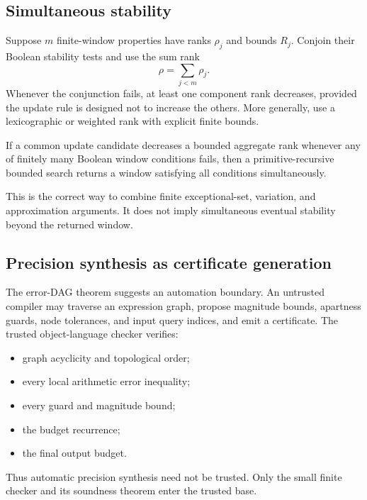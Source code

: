 \subsection{Simultaneous stability}

Suppose $m$ finite-window properties have ranks $\rho_j$ and bounds $R_j$.  Conjoin their Boolean stability tests and use the sum rank
\[
  \rho=\sum_{j<m}\rho_j.
\]
Whenever the conjunction fails, at least one component rank decreases, provided the update rule is designed not to increase the others.  More generally, use a lexicographic or weighted rank with explicit finite bounds.

\begin{corollary}
\label{cor:common-window}
If a common update candidate decreases a bounded aggregate rank whenever any of finitely many Boolean window conditions fails, then a primitive-recursive bounded search returns a window satisfying all conditions simultaneously.
\end{corollary}

This is the correct way to combine finite exceptional-set, variation, and approximation arguments.  It does not imply simultaneous eventual stability beyond the returned window.

\subsection{Precision synthesis as certificate generation}

The error-DAG theorem suggests an automation boundary.  An untrusted compiler may traverse an expression graph, propose magnitude bounds, apartness guards, node tolerances, and input query indices, and emit a certificate.  The trusted object-language checker verifies:
\begin{itemize}
\item graph acyclicity and topological order;
\item every local arithmetic error inequality;
\item every guard and magnitude bound;
\item the budget recurrence;
\item the final output budget.
\end{itemize}
Thus automatic precision synthesis need not be trusted.  Only the small finite checker and its  soundness theorem enter the trusted base.
